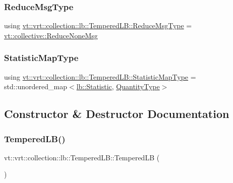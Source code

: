 \subsubsection{\texorpdfstring{Reduce\+Msg\+Type}{ReduceMsgType}}
{\footnotesize\ttfamily using \hyperlink{structvt_1_1vrt_1_1collection_1_1lb_1_1_tempered_l_b_a3e688a286b16334d43666bae581231b7}{vt\+::vrt\+::collection\+::lb\+::\+Tempered\+L\+B\+::\+Reduce\+Msg\+Type} =  \hyperlink{namespacevt_1_1collective_aa439a90f05078f2bcf918641c951946f}{vt\+::collective\+::\+Reduce\+None\+Msg}}

\mbox{\label{structvt_1_1vrt_1_1collection_1_1lb_1_1_tempered_l_b_ad9f4a2ede0929ca64fc6108cc812db33}} 
\subsubsection{\texorpdfstring{Statistic\+Map\+Type}{StatisticMapType}}
{\footnotesize\ttfamily using \hyperlink{structvt_1_1vrt_1_1collection_1_1lb_1_1_tempered_l_b_ad9f4a2ede0929ca64fc6108cc812db33}{vt\+::vrt\+::collection\+::lb\+::\+Tempered\+L\+B\+::\+Statistic\+Map\+Type} =  std\+::unordered\+\_\+map$<$\hyperlink{namespacevt_1_1vrt_1_1collection_1_1lb_af0e20ef9afee77295053aa83bf1348b1}{lb\+::\+Statistic}, \hyperlink{structvt_1_1vrt_1_1collection_1_1lb_1_1_base_l_b_a864b2c437d81680577013741e265ef0d}{Quantity\+Type}$>$}



\subsection{Constructor \& Destructor Documentation}
\mbox{\label{structvt_1_1vrt_1_1collection_1_1lb_1_1_tempered_l_b_aa891f50b88bc2c43675205fe42f1a1bc}} 
\subsubsection{\texorpdfstring{Tempered\+L\+B()}{TemperedLB()}\hspace{0.1cm}{\footnotesize\ttfamily [1/2]}}
{\footnotesize\ttfamily vt\+::vrt\+::collection\+::lb\+::\+Tempered\+L\+B\+::\+Tempered\+LB (\begin{DoxyParamCaption}{ }\end{DoxyParamCaption})\hspace{0.3cm}{\ttfamily [default]}}

